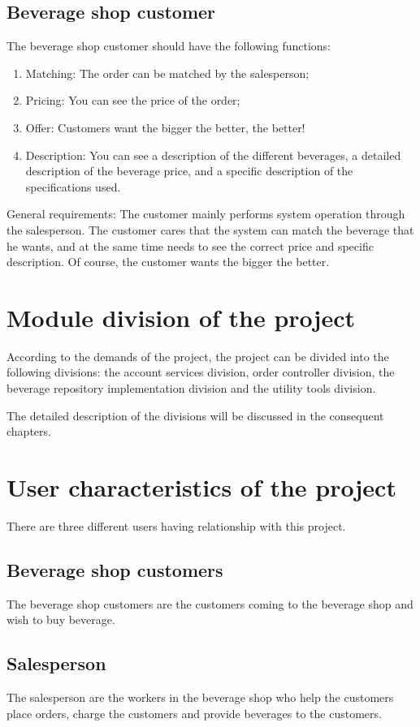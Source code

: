 \documentclass[a4paper]{report}
\begin{document}
\subsection{Beverage shop customer}
The beverage shop customer should have the following functions:
\begin{enumerate}
\item
Matching: The order can be matched by the salesperson;
\item
Pricing: You can see the price of the order;
\item
Offer: Customers want the bigger the better, the better!
\item
Description: You can see a description of the different beverages, a detailed description of the beverage price, and a specific description of the specifications used.
\end{enumerate}
\par
General requirements: The customer mainly performs system operation through the salesperson. The customer cares that the system can match the beverage that he wants, and at the same time needs to see the correct price and specific description. Of course, the customer wants the bigger the better.
\section{Module division of the project}
According to the demands of the project, the project can be divided into the following divisions:
the account services division, order controller division, the beverage repository implementation division and the utility tools division.
\par
The detailed description of the divisions will be discussed in the consequent chapters.
\section{User characteristics of the project}
There are three different users having relationship with this project.
\subsection{Beverage shop customers}
The beverage shop customers are the customers coming to the beverage shop and wish to buy beverage.
\subsection{Salesperson}
The salesperson are the workers in the beverage shop who help the customers place orders, charge the customers and provide beverages to the customers.
\end{document}
